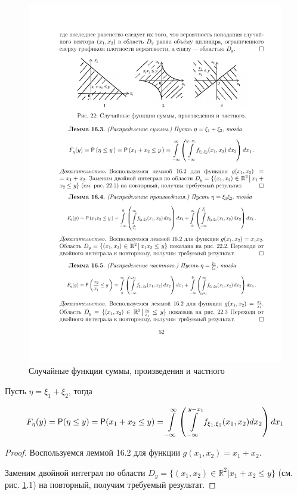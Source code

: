 \begin{figure}[h!]
	\centering
	\includegraphics[]{pic/pic22}
	\caption{Случайные функции суммы, произведения и частного}
	\label{fig22}
\end{figure}

\begin{lemma}
Пусть $\eta = \xi_1 + \xi_2$, тогда

\begin{gather*}
	F_\eta (y) = \P ( \eta \leq y ) = \P(x_1+x_2 \leq y )=
	\int\limits_{-\infty}^{\infty}\left(
		\int\limits_{-\infty}^{y-x_1 } f_{\xi_1,\xi_2} (x_1 , x_2 ) dx_2
	\right)dx_1
\end{gather*}
\end{lemma}
\begin{proof}
Воспользуемся леммой 16.2 для функции $g(x_1 , x_2 )=x_1 + x_2$. 

Заменим двойной интеграл по области $D_y = \{(x_1 , x_2 ) \in \mathbb{R}^2 | x_1 +
x_2 \leq y\}$ (см. рис. \ref{fig22}.1) на повторный, получим требуемый результат.	
\end{proof}

